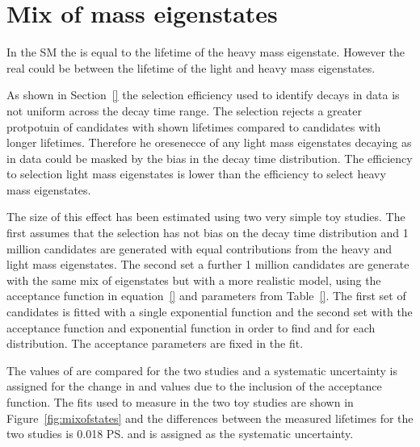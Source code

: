 \section{Mix of \bs mass eigenstates}
\label{sec:mixofeigenstates}

In the SM the \bsmumu \el is equal to the lifetime of the heavy \bs mass eigenstate. However the real \bsmumu \el could be between the lifetime of the light and heavy mass eigenstates. %

As shown in Section~\ref{} the selection efficiency used to identify \bsmumu decays in data is not uniform across the decay time range. The selection rejects a greater protpotuin of candidates with shown lifetimes compared to candidates with longer lifetimes. Therefore he oresenecce of any \bs light mass eigenstates decaying as \bsmumu in data could be masked by the bias in the decay time distribution. The efficiency to selection light \bs mass eigenstates is lower than the efficiency to select heavy \bs mass eigenstates.

The size of this effect has been estimated using two very simple toy studies. The first assumes that the selection has not bias on the decay time distribution and 1 million candidates are generated with equal contributions from the heavy and light \bs mass eigenstates.%
The second set a further 1 million candidates are generate with the same mix of eigenstates but with a more realistic model, using the acceptance function in equation~\ref{} and parameters from Table~\ref{}. The first set of candidates is fitted with a single exponential function and the second set with the acceptance function and exponential function in order to find \tmumu and \Gmumu for each distribution. The acceptance parameters are fixed in the fit.

The values of \tmumu are compared for the two studies and a systematic uncertainty is assigned for the change in \tmumu and values due to the inclusion of the acceptance function. The \ml fits used to measure \tmumu in the two toy studies are shown in Figure~\ref{fig:mixofstates} and the differences between the measured lifetimes for the two studies is 0.018 \ps and is assigned as the systematic uncertainty.


